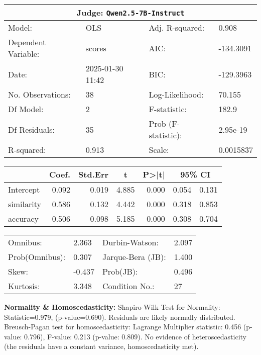 \begin{center}
\small
\begin{tabular}{@{}ll@{\hspace{15pt}}ll@{}}
\toprule
\multicolumn{4}{c}{\textbf{Judge:} \texttt{Qwen2.5-7B-Instruct} \citep{qwen2025qwen25technicalreport}} \\
\midrule
Model: & OLS & Adj. R-squared: & 0.908 \\
Dependent Variable: & scores & AIC: & -134.3091 \\
Date: & 2025-01-30 11:42 & BIC: & -129.3963 \\
No. Observations: & 38 & Log-Likelihood: & 70.155 \\
Df Model: & 2 & F-statistic: & 182.9 \\
Df Residuals: & 35 & Prob (F-statistic): & 2.95e-19 \\
R-squared: & 0.913 & Scale: & 0.0015837 \\
\bottomrule
\end{tabular}

\vspace{5pt}
\begin{tabular}{lrrrrrr}
\toprule
 & \multicolumn{1}{c}{Coef.} & \multicolumn{1}{c}{Std.Err} & \multicolumn{1}{c}{t} & \multicolumn{1}{c}{P>|t|} & \multicolumn{2}{c}{95\% CI} \\
\midrule
Intercept & 0.092 & 0.019 & 4.885 & 0.000 & 0.054 & 0.131 \\
similarity & 0.586 & 0.132 & 4.442 & 0.000 & 0.318 & 0.853 \\
accuracy & 0.506 & 0.098 & 5.185 & 0.000 & 0.308 & 0.704 \\
\bottomrule
\end{tabular}

\vspace{5pt}
\begin{tabular}{llll}
\toprule
\midrule
Omnibus: & 2.363 & Durbin-Watson: & 2.097 \\
Prob(Omnibus): & 0.307 & Jarque-Bera (JB): & 1.400 \\
Skew: & -0.437 & Prob(JB): & 0.496 \\
Kurtosis: & 3.348 & Condition No.: & 27 \\
\bottomrule
\end{tabular}
\end{center}

\textbf{Normality \& Homoscedasticity:} Shapiro-Wilk Test for Normality: Statistic=0.979, (p-value=0.690).  
Residuals are likely normally distributed. 
Breusch-Pagan test for homoscedasticity:
Lagrange Multiplier statistic: 0.456
(p-value: 0.796), 
F-value: 0.213  
(p-value: 0.809). 
No evidence of heteroscedasticity (the residuals have a constant variance, homoscedasticity met).

